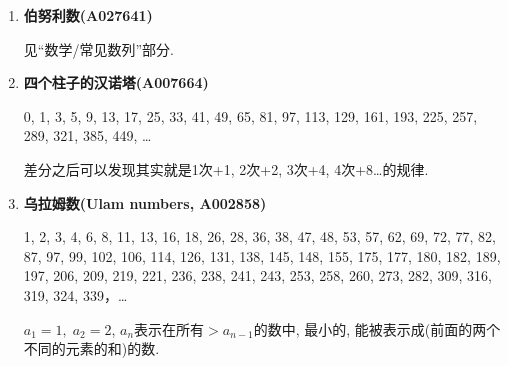 \begin{enumerate}

\item \textbf{伯努利数(A027641)}

见``数学/常见数列''部分.

\item \textbf{四个柱子的汉诺塔(A007664)}

0, 1, 3, 5, 9, 13, 17, 25, 33, 41, 49, 65, 81, 97, 113, 129, 161, 193, 225, 257, 289, 321, 385, 449, \dots

差分之后可以发现其实就是1次+1, 2次+2, 3次+4, 4次+8\dots 的规律.

\item \textbf{乌拉姆数(Ulam numbers, A002858)}

1, 2, 3, 4, 6, 8, 11, 13, 16, 18, 26, 28, 36, 38, 47, 48, 53, 57, 62, 69, 72, 77, 82, 87, 97, 99, 102, 106, 114, 126, 131, 138, 145, 148, 155, 175, 177, 180, 182, 189, 197, 206, 209, 219, 221, 236, 238, 241, 243, 253, 258, 260, 273, 282, 309, 316, 319, 324, 339，\dots

$ a_1 = 1,\; a_2 = 2 $, $a_n$表示在所有$>a_{n-1}$的数中, 最小的, 能被表示成(前面的两个不同的元素的和)的数.

\end{enumerate}